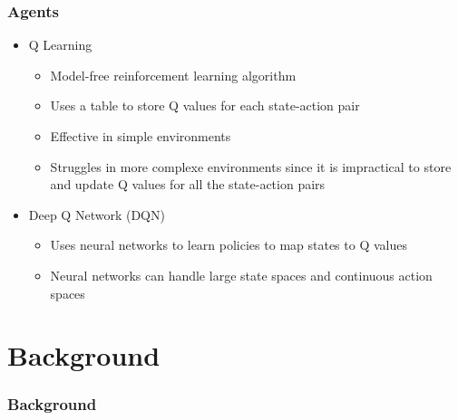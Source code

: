 \documentclass{beamer}
\begin{document}
\begin{frame}
    \frametitle{Agents}
    \begin{itemize}
        \item Q Learning \pause
              \begin{itemize}
                  \item Model-free reinforcement learning algorithm \pause
                  \item Uses a table to store Q values for each state-action pair \pause
                  \item Effective in simple environments\pause
                  \item Struggles in more complexe environments since it is impractical to store and
                        update Q values for all the state-action pairs\pause
              \end{itemize}
        \item Deep Q Network (DQN) \pause
              \begin{itemize}
                  \item Uses neural networks to learn policies to map states to Q values\pause
                  \item Neural networks can handle large state spaces and continuous action spaces
              \end{itemize}
    \end{itemize}
\end{frame}

\section{Background}
\begin{frame}
    \frametitle{Background}

\end{frame}
\end{document}
